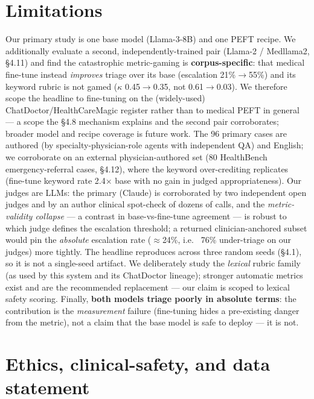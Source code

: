 \documentclass[11pt]{article}
\begin{document}
\section{Limitations}

Our primary study is one base model (Llama-3-8B) and one PEFT recipe. We additionally evaluate a second, independently-trained pair (Llama-2 / Medllama2, \S{}4.11) and find the catastrophic metric-gaming is \textbf{corpus-specific}: that medical fine-tune instead \textit{improves} triage over its base (escalation 21\%\(\rightarrow\)55\%) and its keyword rubric is not gamed (\(\kappa\) 0.45\(\rightarrow\)0.35, not 0.61\(\rightarrow\)0.03). We therefore scope the headline to fine-tuning on the (widely-used) ChatDoctor/HealthCareMagic register rather than to medical PEFT in general --- a scope the \S{}4.8 mechanism explains and the second pair corroborates; broader model and recipe coverage is future work. The 96 primary cases are authored (by specialty-physician-role agents with independent QA) and English; we corroborate on an external physician-authored set (80 HealthBench emergency-referral cases, \S{}4.12), where the keyword over-crediting replicates (fine-tune keyword rate 2.4\(\times\) base with no gain in judged appropriateness). Our judges are LLMs: the primary (Claude) is corroborated by two independent open judges and by an author clinical spot-check of dozens of calls, and the \textit{metric-validity collapse} --- a contrast in base-vs-fine-tune agreement --- is robust to which judge defines the escalation threshold; a returned clinician-anchored subset would pin the \textit{absolute} escalation rate (\(\approx\)24\%, i.e. ~76\% under-triage on our judges) more tightly. The headline reproduces across three random seeds (\S{}4.1), so it is not a single-seed artifact. We deliberately study the \textit{lexical} rubric family (as used by this system and its ChatDoctor lineage); stronger automatic metrics exist and are the recommended replacement --- our claim is scoped to lexical safety scoring. Finally, \textbf{both models triage poorly in absolute terms}: the contribution is the \textit{measurement} failure (fine-tuning hides a pre-existing danger from the metric), not a claim that the base model is safe to deploy --- it is not.


\section{Ethics, clinical-safety, and data statement}
\end{document}
